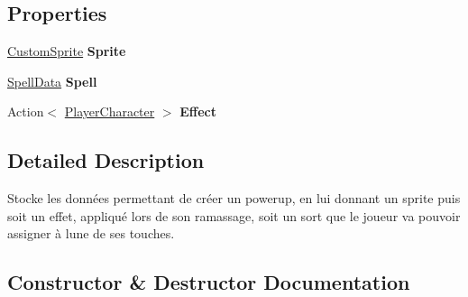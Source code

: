 \subsection*{Properties}
\begin{DoxyCompactItemize}
\item 
\mbox{\label{class_tentacle_slicers_1_1powerups_1_1_powerup_data_a58bb5e203eafd7ddd0e9ab78f42f7f61}} 
\hyperlink{class_tentacle_slicers_1_1graphics_1_1_custom_sprite}{Custom\+Sprite} {\bfseries Sprite}
\item 
\mbox{\label{class_tentacle_slicers_1_1powerups_1_1_powerup_data_afb6a292654ee8d0f63486dbc369ac18e}} 
\hyperlink{class_tentacle_slicers_1_1spells_1_1_spell_data}{Spell\+Data} {\bfseries Spell}
\item 
\mbox{\label{class_tentacle_slicers_1_1powerups_1_1_powerup_data_a80c6ba09e9e9459d9c03443f47fa8fd4}} 
Action$<$ \hyperlink{class_tentacle_slicers_1_1actors_1_1_player_character}{Player\+Character} $>$ {\bfseries Effect}
\end{DoxyCompactItemize}


\subsection{Detailed Description}
Stocke les données permettant de créer un powerup, en lui donnant un sprite puis soit un effet, appliqué lors de son ramassage, soit un sort que le joueur va pouvoir assigner à l\textquotesingle{}une de ses touches. 



\subsection{Constructor \& Destructor Documentation}
\mbox{\label{class_tentacle_slicers_1_1powerups_1_1_powerup_data_a55e36b4cbc04fe207ab91a775091e663}} 
